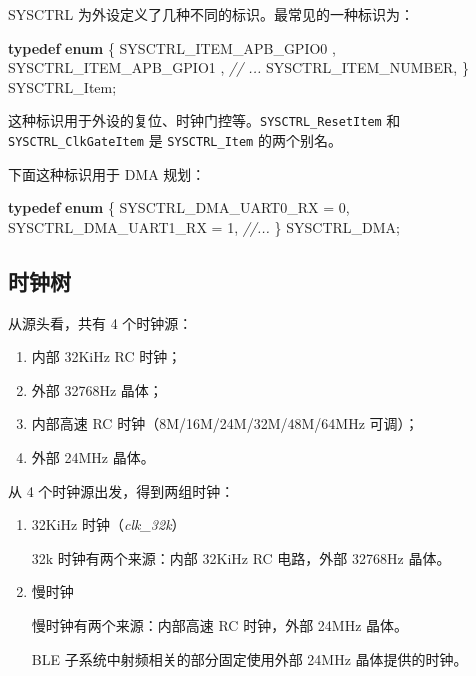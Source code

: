 \documentclass[
  12pt,
]{book}
\newenvironment{Shaded}{\begin{snugshade}}{\end{snugshade}}
\newcommand{\CommentTok}[1]{\textcolor[rgb]{0.56,0.35,0.01}{\textit{#1}}}
\newcommand{\DecValTok}[1]{\textcolor[rgb]{0.00,0.00,0.81}{#1}}
\newcommand{\KeywordTok}[1]{\textcolor[rgb]{0.13,0.29,0.53}{\textbf{#1}}}
\newcommand{\NormalTok}[1]{#1}
\providecommand{\tightlist}{%
  \setlength{\itemsep}{0pt}\setlength{\parskip}{0pt}}
\begin{document}
SYSCTRL 为外设定义了几种不同的标识。最常见的一种标识为：

\begin{Shaded}
\begin{Highlighting}[]
\KeywordTok{typedef} \KeywordTok{enum}
\NormalTok{\{}
\NormalTok{    SYSCTRL_ITEM_APB_GPIO0     ,}
\NormalTok{    SYSCTRL_ITEM_APB_GPIO1     ,}
    \CommentTok{// ...}
\NormalTok{    SYSCTRL_ITEM_NUMBER,}
\NormalTok{\} SYSCTRL_Item;}
\end{Highlighting}
\end{Shaded}

这种标识用于外设的复位、时钟门控等。\texttt{SYSCTRL\_ResetItem} 和 \texttt{SYSCTRL\_ClkGateItem} 是
\texttt{SYSCTRL\_Item} 的两个别名。

下面这种标识用于 DMA 规划：

\begin{Shaded}
\begin{Highlighting}[]
\KeywordTok{typedef} \KeywordTok{enum}
\NormalTok{\{}
\NormalTok{    SYSCTRL_DMA_UART0_RX = }\DecValTok{0}\NormalTok{,}
\NormalTok{    SYSCTRL_DMA_UART1_RX = }\DecValTok{1}\NormalTok{,}
    \CommentTok{//...}
\NormalTok{\} SYSCTRL_DMA;}
\end{Highlighting}
\end{Shaded}

\hypertarget{ux65f6ux949fux6811}{%
\subsection{时钟树}\label{ux65f6ux949fux6811}}

从源头看，共有 4 个时钟源：

\begin{enumerate}
\def\labelenumi{\arabic{enumi}.}
\tightlist
\item
  内部 32KiHz RC 时钟；
\item
  外部 32768Hz 晶体；
\item
  内部高速 RC 时钟（8M/16M/24M/32M/48M/64MHz 可调）；
\item
  外部 24MHz 晶体。
\end{enumerate}

从 4 个时钟源出发，得到两组时钟：

\begin{enumerate}
\def\labelenumi{\arabic{enumi}.}
\item
  32KiHz 时钟（\emph{clk\_32k}）

  32k 时钟有两个来源：内部 32KiHz RC 电路，外部 32768Hz 晶体。
\item
  慢时钟

  慢时钟有两个来源：内部高速 RC 时钟，外部 24MHz 晶体。

  BLE 子系统中射频相关的部分固定使用外部 24MHz 晶体提供的时钟。
\end{enumerate}
\end{document}
